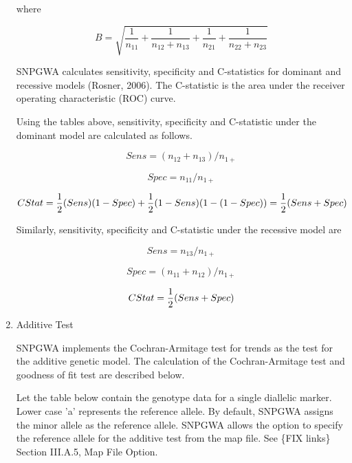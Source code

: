 \begin{enumerate}
where 

\begin{equation*}
  B = \sqrt{\frac{1}{n_{11}} + \frac{1}{n_{12}+n_{13}} + \frac{1}{n_{21}} + \frac{1}{n_{22}+n_{23}}}
\end{equation*}

SNPGWA calculates sensitivity, specificity and C-statistics for dominant and
recessive models (Rosner, 2006).  The C-statistic is the area under the receiver
operating characteristic (ROC) curve.

Using the tables above, sensitivity, specificity and C-statistic under the
dominant model are calculated as follows.

\begin{equation*}
  Sens = (n_{12} + n_{13})/n_{1+}
\end{equation*}

\begin{equation*}
  Spec = n_{11}/n_{1+}
\end{equation*}

\begin{equation*}
  C\-Stat = \frac{1}{2}(Sens)(1-Spec) + \frac{1}{2}(1-Sens)(1-(1-Spec))=\frac{1}{2}(Sens+Spec)
\end{equation*}

Similarly, sensitivity, specificity and C-statistic under the recessive model are

\begin{equation*}
  Sens = n_{13}/n_{1+}
\end{equation*}

\begin{equation*}
  Spec = (n_{11} +n_{12})/n_{1+}
\end{equation*}

\begin{equation*}
  C\-Stat = \frac{1}{2}(Sens+Spec)
\end{equation*}

\item{Additive Test}

SNPGWA implements the Cochran-Armitage test for trends as the test for the
additive genetic model.  The calculation of the Cochran-Armitage test and
goodness of fit test are described below.

Let the table below contain the genotype data for a single diallelic marker.
Lower case 'a' represents the reference allele.  By default, SNPGWA assigns the
minor allele as the reference allele.  SNPGWA allows the option to specify the
reference allele for the additive test from the map file.  See \{FIX links\}
Section III.A.5, Map File Option.


\end{enumerate}
